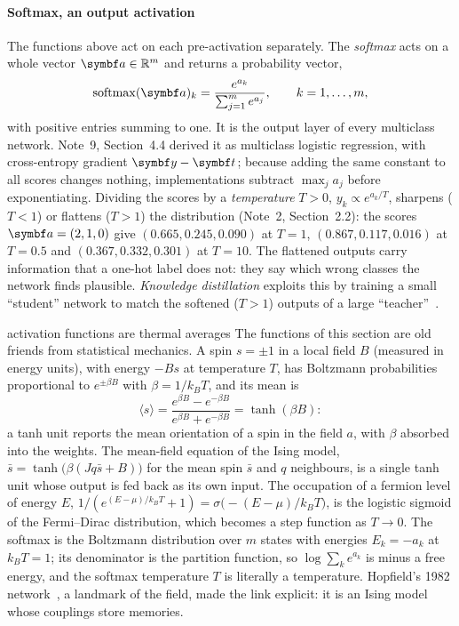 \documentclass[11pt]{article}
\newcommand{\y}{\vect{y}}
\newcommand{\vt}{\vect{t}}
\newcommand{\va}{\vect{a}}
\newcommand{\softmax}{\operatorname{softmax}}
\begin{document}
\paragraph{Softmax, an output activation} The functions above act on each pre-activation separately. The
\emph{softmax} acts on a whole vector $\va \in \R^m$ and returns a probability vector,
\begin{equation}\label{eq:softmax}
  \softmax(\va)_k = \frac{e^{a_k}}{\sum_{j=1}^m e^{a_j}}, \qquad k = 1, \dots, m ,
\end{equation}
with positive entries summing to one. It is the output layer of every multiclass network. Note~9, Section~4.4 derived
it as multiclass logistic regression, with cross-entropy gradient $\y - \vt$; because adding the same constant to all
scores changes nothing, implementations subtract $\max_j a_j$ before exponentiating. Dividing the scores by a
\emph{temperature} $T > 0$, $y_k \propto e^{a_k/T}$, sharpens ($T < 1$) or flattens ($T > 1$) the distribution (Note~2,
Section~2.2): the scores $\va = (2, 1, 0)$ give $(0.665, 0.245, 0.090)$ at $T = 1$, $(0.867, 0.117, 0.016)$ at
$T = 0.5$ and $(0.367, 0.332, 0.301)$ at $T = 10$. The flattened outputs carry information that a one-hot label does
not: they say which wrong classes the network finds plausible. \emph{Knowledge distillation} exploits this by training
a small ``student'' network to match the softened ($T > 1$) outputs of a large ``teacher''~\cite{hinton2015}.

\begin{physics}{activation functions are thermal averages}
The functions of this section are old friends from statistical mechanics. A spin $s = \pm 1$ in a local field $B$ (measured in energy units), with
energy $-Bs$ at temperature $T$, has Boltzmann probabilities proportional to $e^{\pm\beta B}$ with $\beta =
1/k_BT$, and its mean is
\[
  \langle s \rangle = \frac{e^{\beta B} - e^{-\beta B}}{e^{\beta B} + e^{-\beta B}} = \tanh(\beta B) :
\]
a tanh unit reports the mean orientation of a spin in the field $a$, with $\beta$ absorbed into the weights. The
mean-field equation of the Ising model, $\bar s = \tanh\big(\beta(Jq\bar s + B)\big)$ for the mean spin $\bar s$ and
$q$ neighbours, is a single tanh unit
whose output is fed back as its own input. The occupation of a fermion level of energy $E$, $1/(e^{(E - \mu)/k_BT} +
1) = \sigma\big(-(E - \mu)/k_BT\big)$, is the logistic sigmoid of the Fermi--Dirac distribution, which becomes a step
function as $T \to 0$. The softmax is the Boltzmann distribution over $m$ states with energies $E_k = -a_k$ at $k_BT =
1$; its denominator is the partition function, so $\log\sum_k e^{a_k}$ is minus a free energy, and the softmax
temperature $T$ is literally a temperature. Hopfield's 1982 network~\cite{hopfield1982}, a landmark of the
field, made the link explicit: it is an Ising model whose couplings store memories.
\end{physics}
\end{document}
